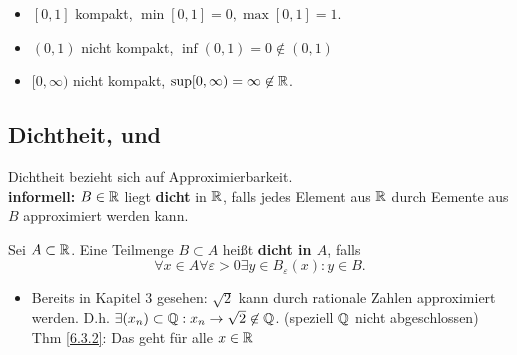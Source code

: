 \begingroup
\color{red}
\begin{itemize}
	\item $ [0, 1] $ kompakt, $ \min[0, 1] = 0, \max[0, 1] = 1 $.
	\item $ (0, 1) $ nicht kompakt, $ \inf(0, 1) = 0 \not\in (0, 1) $ 
	\item $ [0, \infty) $ nicht kompakt, $ \sup[0, \infty) = \infty \not\in \mathbb{R} $.
\end{itemize}
\endgroup

\subsection{Dichtheit,  und  }
Dichtheit bezieht sich auf Approximierbarkeit.\\
\textbf{informell:} $ B \in \mathbb{R} $ liegt \textbf{dicht} in $ \mathbb{R} $, falls jedes Element aus $ \mathbb{R} $ durch Eemente aus $ B $ approximiert werden kann.
\begin{subdefinition}
	Sei $ A \subset \mathbb{R} $. Eine Teilmenge $ B \subset A $ heißt \textbf{dicht in $ A $}, falls
	\[
	\forall x \in  A \forall  \varepsilon > 0 \exists  y \in B_{\varepsilon}(x): y \in B.
	\]
\end{subdefinition}

\begin{subtheorem}
	\begin{itemize}
		\item Bereits in Kapitel 3 gesehen: $ \sqrt{2} $ kann durch rationale Zahlen approximiert werden. D.h. $ \exists (x_n) \subset \mathbb{Q} : x_n \to \sqrt{2} \not\in \mathbb{Q} $. (speziell $ \mathbb{Q} $ nicht abgeschlossen) Thm \ref{6.3.2}: Das geht für alle $ x \in \mathbb{R} $
	\end{itemize}
\end{subtheorem}


